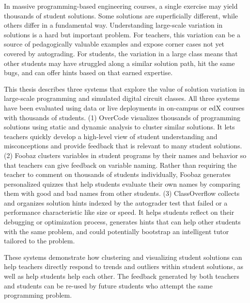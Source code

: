 %
%
%

In massive programming-based engineering courses, a single exercise may yield thousands of student solutions. Some solutions are superficially different, while others differ in a fundamental way. Understanding large-scale variation in solutions is a hard but important problem. For teachers, this variation can be a source of pedagogically valuable examples and expose corner cases not yet covered by autograding. For students, the variation in a large class means that other students may have struggled along a similar solution path, hit the same bugs, and can offer hints based on that earned expertise.

This thesis describes three systems that explore the value of solution variation in large-scale programming and simulated digital circuit classes. All three systems have been evaluated using data or live deployments in on-campus or edX courses with thousands of students. (1) OverCode visualizes thousands of programming solutions using static and dynamic analysis to cluster similar solutions. It lets teachers quickly develop a high-level view of student understanding and misconceptions and provide feedback that is relevant to many student solutions. (2) Foobaz clusters variables in student programs by their names and behavior so that teachers can give feedback on variable naming. Rather than requiring the teacher to comment on thousands of students individually, Foobaz generates personalized quizzes that help students evaluate their own names by comparing them with good and bad names from other students. (3) ClassOverflow collects and organizes solution hints indexed by the autograder test that failed or a performance characteristic like size or speed. It helps students reflect on their debugging or optimization process, generates hints that can help other students with the same problem, and could potentially bootstrap an intelligent tutor tailored to the problem.

These systems demonstrate how clustering and visualizing student solutions can help teachers directly respond to trends and outliers within student solutions, as well as help students help each other. The feedback generated by both teachers and students can be re-used by future students who attempt the same programming problem.

